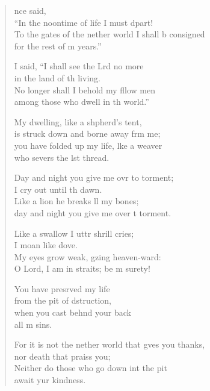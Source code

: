 \begin{verse}
  \begin{patverse}
    nce  said,\Med\\
“In the noontime of life I must dpart!\\
To the gates of the nether world I shall b consigned\Med\\
for the rest of m years.”

I said, “I shall see the Lrd no more\Med\\
in the land of th living.\\
No longer shall I behold my fllow men\Med\\
among those who dwell in th world.”

My dwelling, like a shpherd’s tent,\Med\\
is struck down and borne away frm me;\\
you have folded up my life, l\pointup{\i}ke a weaver\Med\\
who severs the lst thread.

Day and night you give me ovr to torment;\Med\\
I cry out until th dawn.\\
Like a lion he breaks ll my bones;\Med\\
day and night you give me over t torment.

Like a swallow I uttr shrill cries;\Med\\
I moan like  dove.\\
My eyes grow weak, gzing heaven-ward:\Med\\
O Lord, I am in straits; be m surety!

You have presrved my life\Med\\
from the pit of dstruction,\\
when you cast beh\pointup{\i}nd your back\Med\\
all m sins.

For it is not the nether world that g\pointup{\i}ves you thanks,\Med\\
nor death that praiss you;\\
Neither do those who go down int the pit\Med\\
await yur kindness.


\end{patverse}
\end{verse}
